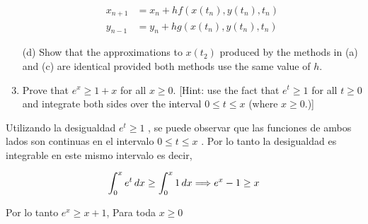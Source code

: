 \begin{enumerate}
 		 	\begin{align*}
 		 	x_{n+1} &= x_n + hf(x(t_n), y(t_n), t_n) \\
 		 	y_{n-1} &= y_n + hg(x(t_n), y(t_n), t_n)  
 		 	\end{align*}
 
 	 	\item[(d)] 
 	Show that the approximations to $x(t_2)$ produced by the methods
 	in (a) and (c) are identical provided both methods use the same
 	value of $h$.
 	\item
 	Prove that $e^x \geq 1 + x$ for all $x \geq 0$. [Hint: use the fact that $e^t \geq 1$
 	for all $t \geq 0$ and integrate both sides over the interval $0 \leq t \leq x$
 	(where $x \geq 0$.)]
 \end{enumerate}
 	
	 	Utilizando la desigualdad $e^t \geq 1$ , se puede observar que las funciones de
	 	ambos lados son continuas en el intervalo $0 \leq t \leq x$ . Por lo tanto la desigualdad es integrable en este mismo intervalo es decir, 
 	
 	\[
 	\int_{0}^{x} e^{t} \, dx \geq \int_{0}^{x} 1 \, dx 
    \Longrightarrow e^x - 1 \geq x \\
 	\]
 	
 	Por lo tanto $e^x \geq x + 1$, Para toda $x\geq0$
 
